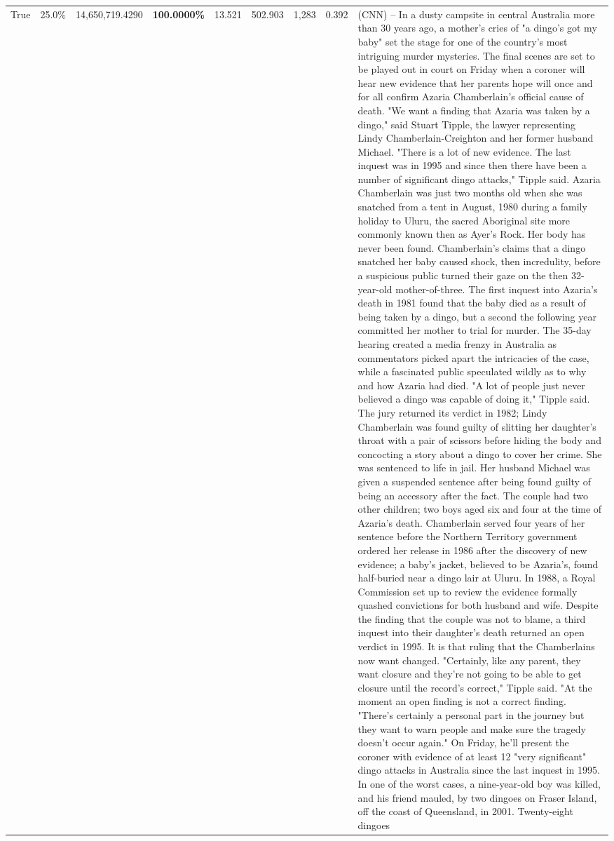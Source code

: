 \begin{table}[H]
\begin{tabular}{lllrlllll}
True & 25.0\% & 14,650,719.4290 & \bfseries \color{red} 100.0000\% & 13.521 & 502.903 & 1,283 & 0.392 & (CNN) -- In a dusty campsite in central Australia more than 30 years ago, a mother's cries of "a dingo's got my baby" set the stage for one of the country's most intriguing murder mysteries. The final scenes are set to be played out in court on Friday when a coroner will hear new evidence that her parents hope will once and for all confirm Azaria Chamberlain's official cause of death. "We want a finding that Azaria was taken by a dingo," said Stuart Tipple, the lawyer representing Lindy Chamberlain-Creighton and her former husband Michael. "There is a lot of new evidence. The last inquest was in 1995 and since then there have been a number of significant dingo attacks," Tipple said. Azaria Chamberlain was just two months old when she was snatched from a tent in August, 1980 during a family holiday to Uluru, the sacred Aboriginal site more commonly known then as Ayer's Rock. Her body has never been found. Chamberlain's claims that a dingo snatched her baby caused shock, then incredulity, before a suspicious public turned their gaze on the then 32-year-old mother-of-three. The first inquest into Azaria's death in 1981 found that the baby died as a result of being taken by a dingo, but a second the following year committed her mother to trial for murder. The 35-day hearing created a media frenzy in Australia as commentators picked apart the intricacies of the case, while a fascinated public speculated wildly as to why and how Azaria had died. "A lot of people just never believed a dingo was capable of doing it," Tipple said. The jury returned its verdict in 1982; Lindy Chamberlain was found guilty of slitting her daughter's throat with a pair of scissors before hiding the body and concocting a story about a dingo to cover her crime. She was sentenced to life in jail. Her husband Michael was given a suspended sentence after being found guilty of being an accessory after the fact. The couple had two other children; two boys aged six and four at the time of Azaria's death. Chamberlain served four years of her sentence before the Northern Territory government ordered her release in 1986 after the discovery of new evidence; a baby's jacket, believed to be Azaria's, found half-buried near a dingo lair at Uluru. In 1988, a Royal Commission set up to review the evidence formally quashed convictions for both husband and wife. Despite the finding that the couple was not to blame, a third inquest into their daughter's death returned an open verdict in 1995. It is that ruling that the Chamberlains now want changed. "Certainly, like any parent, they want closure and they're not going to be able to get closure until the record's correct," Tipple said. "At the moment an open finding is not a correct finding. "There's certainly a personal part in the journey but they want to warn people and make sure the tragedy doesn't occur again." On Friday, he'll present the coroner with evidence of at least 12 "very significant" dingo attacks in Australia since the last inquest in 1995. In one of the worst cases, a nine-year-old boy was killed, and his friend mauled, by two dingoes on Fraser Island, off the coast of Queensland, in 2001. Twenty-eight dingoes 
\end{tabular}
\end{table}

